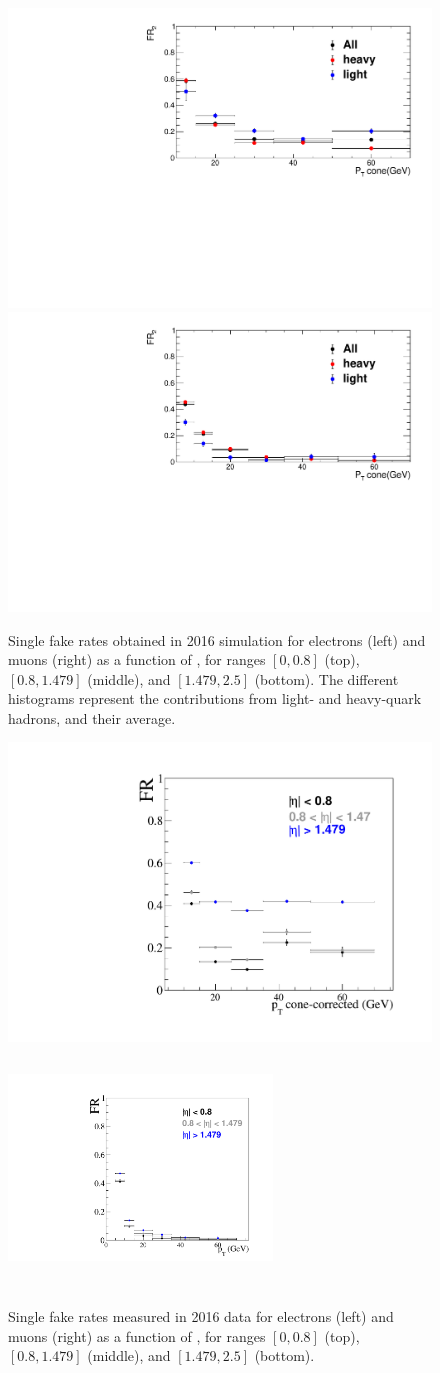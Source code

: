 \begin{figure}[t!]
  \includegraphics[width=.48\textwidth]{Figures/c6/backgrounds/FR/sFR/QCD/LeptonPt_ele_eta3_FR2.pdf}
  \hfill{}
  \includegraphics[width=.48\textwidth]{Figures/c6/backgrounds/FR/sFR/QCD/LeptonPt_mu_eta3_FR2.pdf}\\
  \caption{Single fake rates obtained in 2016 simulation for electrons
    (left) and muons (right) as a function of \ptc, for \abseta ranges
    $[0,0.8]$ (top), $[0.8,1.479]$ (middle), and $[1.479,2.5]$
    (bottom). The different histograms represent the contributions
    from light- and heavy-quark hadrons, and their average.}
  \label{fig:sFR_mc}
\end{figure}

\begin{figure}[t!]
  \centering
  \includegraphics[width=.46\textwidth]{Figures/c6/backgrounds/FR/sFR/data/electrons.pdf}
  \hfill{}
  \includegraphics[height=6.4cm, width=7.0cm]{Figures/c6/backgrounds/FR/sFR/data/muons.pdf}\\
  \caption{Single fake rates measured in 2016 data for electrons (left) and
    muons (right) as a function of \ptc, for \abseta ranges $[0,0.8]$
    (top), $[0.8,1.479]$ (middle), and $[1.479,2.5]$ (bottom).}
  \label{fig:sFR_data}
\end{figure}

